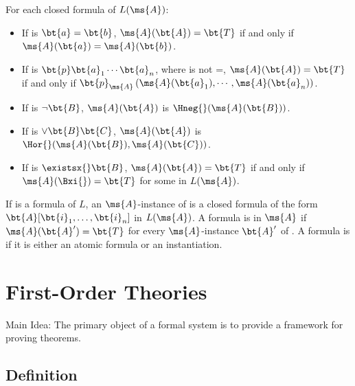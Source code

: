 \noindent
For each closed formula  of $L(\ms{A})$:
\begin{itemize}
	\item If  is $\bt{a} = \bt{b}$, $\ms{A}(\bt{A}) = \bt{T}$ 
	if and only if $\ms{A}(\bt{a}) = \ms{A}(\bt{b})$.
	
	\item If  is $\bt{p}\bt{a}_1 \cdots \bt{a}_n$, where 
	 is not =, $\ms{A}(\bt{A}) = \bt{T}$ if and only if 
	$\bt{p}_\ms{A} \left( \ms{A}(\bt{a}_1), \cdots, 
	\ms{A}(\bt{a}_n) \right)$.
	
	\item If  is $\neg \bt{B}$, $\ms{A}(\bt{A})$ is 
	$\Hneg{}(\ms{A}(\bt{B}))$.
	
	\item If  is $\lor \bt{B} \bt{C}$, $\ms{A}(\bt{A})$ 
	is $\Hor{}(\ms{A}(\bt{B}),\ms{A}(\bt{C}))$.
	
	\item If  is $\existsx{}\bt{B}$, $\ms{A}(\bt{A}) = 
	\bt{T}$ if and 
	only if $\ms{A}(\Bxi{}) = \bt{T}$ for some  in 
	$L(\ms{A})$.
\end{itemize}

If  is a formula of $L$, an $\ms{A}$-instance of  is a 
closed formula of the form $\bt{A}[\bt{i}_1, \dots, \bt{i}_n]$ in 
$L(\ms{A})$.
A formula  is  in 
$\ms{A}$ if $\ms{A}(\bt{A}') = \bt{T}$ for every $\ms{A}$-instance 
$\bt{A}'$ of .
A formula is   if it 
is either an atomic formula or an instantiation.


\newpage

\section{First-Order Theories}

Main Idea: The primary object of a formal system is to provide a 
framework for proving theorems.


\subsection{Definition}

